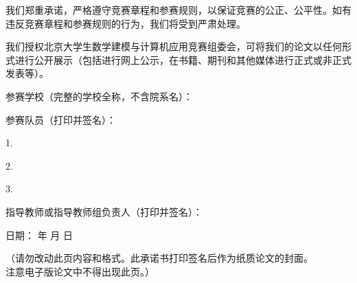 我们郑重承诺，严格遵守竞赛章程和参赛规则，以保证竞赛的公正、公平性。如有违反竞赛章程和参赛规则的行为，我们将受到严肃处理。

我们授权北京大学生数学建模与计算机应用竞赛组委会，可将我们的论文以任何形式进行公开展示（包括进行网上公示，在书籍、期刊和其他媒体进行正式或非正式发表等）。

\vspace{1.1em}

%
\underline{\makebox[7.2cm][c]{\pkb@tihao}}

\vspace{0.65em}

%
\underline{\makebox[7.8cm][c]{\pkb@baominghao}}

\vspace{0.65em}

\noindent 参赛学校（完整的学校全称，不含院系名）：\underline{\makebox[7.0cm][c]{\pkb@schoolname}}

\vspace{0.65em}

\noindent 参赛队员（打印并签名）：
\vspace{0.2em}

\hspace*{3em} 1. \underline{\makebox[7.0cm][c]{\pkb@membera}}

\vspace{0.55em}

\hspace*{3em} 2. \underline{\makebox[7.0cm][c]{\pkb@memberb}}

\vspace{0.55em}

\hspace*{3em} 3. \underline{\makebox[7.0cm][c]{\pkb@memberc}}

\vspace{0.65em}

\noindent 指导教师或指导教师组负责人（打印并签名）：\underline{\makebox[5.5cm][c]{\pkb@supervisor}}

\vspace{0.65em}

\noindent 日期：\underline{\makebox[2.0cm][c]{\the\year}} 年
\underline{\makebox[1.3cm][c]{\pkb@submitmonth}} 月
\underline{\makebox[1.3cm][c]{\pkb@submitday}} 日

\vfill

\begin{center}
  {\songti{} （请勿改动此页内容和格式。此承诺书打印签名后作为纸质论文的封面。\\注意电子版论文中不得出现此页。）}
\end{center}
